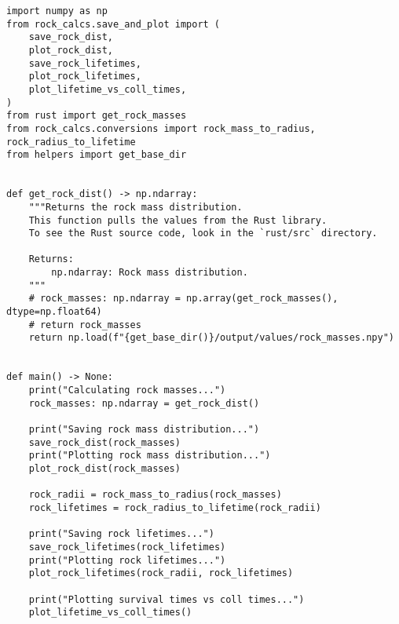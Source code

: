\begin{lstlisting}
import numpy as np
from rock_calcs.save_and_plot import (
    save_rock_dist,
    plot_rock_dist,
    save_rock_lifetimes,
    plot_rock_lifetimes,
    plot_lifetime_vs_coll_times,
)
from rust import get_rock_masses
from rock_calcs.conversions import rock_mass_to_radius, rock_radius_to_lifetime
from helpers import get_base_dir


def get_rock_dist() -> np.ndarray:
    """Returns the rock mass distribution.
    This function pulls the values from the Rust library.
    To see the Rust source code, look in the `rust/src` directory.

    Returns:
        np.ndarray: Rock mass distribution.
    """
    # rock_masses: np.ndarray = np.array(get_rock_masses(), dtype=np.float64)
    # return rock_masses
    return np.load(f"{get_base_dir()}/output/values/rock_masses.npy")


def main() -> None:
    print("Calculating rock masses...")
    rock_masses: np.ndarray = get_rock_dist()

    print("Saving rock mass distribution...")
    save_rock_dist(rock_masses)
    print("Plotting rock mass distribution...")
    plot_rock_dist(rock_masses)

    rock_radii = rock_mass_to_radius(rock_masses)
    rock_lifetimes = rock_radius_to_lifetime(rock_radii)

    print("Saving rock lifetimes...")
    save_rock_lifetimes(rock_lifetimes)
    print("Plotting rock lifetimes...")
    plot_rock_lifetimes(rock_radii, rock_lifetimes)

    print("Plotting survival times vs coll times...")
    plot_lifetime_vs_coll_times()
\end{lstlisting}